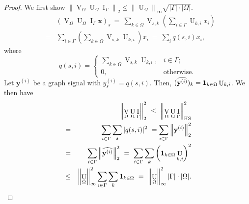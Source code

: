\documentclass[journal,twocolumn,10pt]{IEEEtran}
\theoremstyle{definition}
\DeclareMathOperator{\Id}{I}
\def\x{\mathbf{x}}
\def\y{\mathbf{y}}
\DeclareMathOperator{\Vm}{V}
\DeclareMathOperator{\Um}{U}
\begin{document}
\begin{proof}
 We first show $\left\| \Vm_{\Omega} \Um_{\Omega}  \Id_{\Gamma} \right\|_2 \leq \left\| \Um_{\Omega} \right\|_{\infty}  \sqrt{ |\Gamma|\cdot |\Omega|}$.
\begin{eqnarray*}
&&	( \Vm_{\Omega} \Um_{\Omega} \Id_{\Gamma}  \x )_s
\ = \ \sum_{k \in \Omega} \Vm_{s,k} \left( \sum_{i \in \Gamma} \Um_{k,i} x_i \right)
\\
& = &  \sum_{i \in \Gamma}  \left(   \sum_{k \in \Omega} \Vm_{s,k} \Um_{k,i} \right) x_i
\ = \ \sum_i q(s,i) x_i,
\end{eqnarray*}
   where
   \begin{equation*}
	\label{eq:Delta}
	q(s,i) = 
  \left\{ 
    \begin{array}{rl}
      \sum_{k \in \Omega} \Vm_{s,k} \Um_{k,i}, & i \in \Gamma;\\
      0, & \mbox{otherwise}.
  \end{array} \right.
\end{equation*}
Let $\y^{(i)}$ be a graph signal with $y^{(i)}_s = q(s,i)$. Then, $( \widehat{\y^{(i)}} )_k = {\bf 1}_{k \in \Omega} \Um_{k,i}$. We then have
\begin{eqnarray*}
&&	\left\| \Vm_{\Omega} \Um_{\Omega} \Id_{\Gamma}  \right\|_{2}^2
 \ \leq \  \left\| \Vm_{\Omega} \Um_{\Omega} \Id_{\Gamma}  \right\|_{\rm HS}^2
\\
& = & \sum_{i \in \Gamma} \sum_{s} |q(s,i)|^2 
\ =  \sum_{i \in \Gamma} \left\| \y^{(i)} \right\|_2^2
\\
& = & \sum_{i \in \Gamma} \left\| \widehat{ \y^{(i)} } \right\|_2^2
\ = \  \sum_{i \in \Gamma} \sum_{k} \left( {\bf 1}_{k \in \Omega} \Um_{k,i} \right)^2
\\
& \leq & \left\| \Um_{\Omega} \right\|_{\infty}^2 \sum_{i \in \Gamma} \sum_{k} {\bf 1}_{k \in \Omega} 
\ = \   \left\| \Um_{\Omega} \right\|_{\infty}^2 |\Gamma| \cdot |\Omega|.
\end{eqnarray*}


\end{proof}
\end{document}
